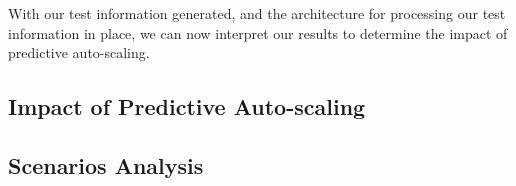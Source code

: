 With our test information generated, and the architecture for processing our
test information in place, we can now interpret our results to determine the
impact of predictive auto-scaling.

\subsection{Impact of Predictive Auto-scaling}



\subsection{Scenarios Analysis}


